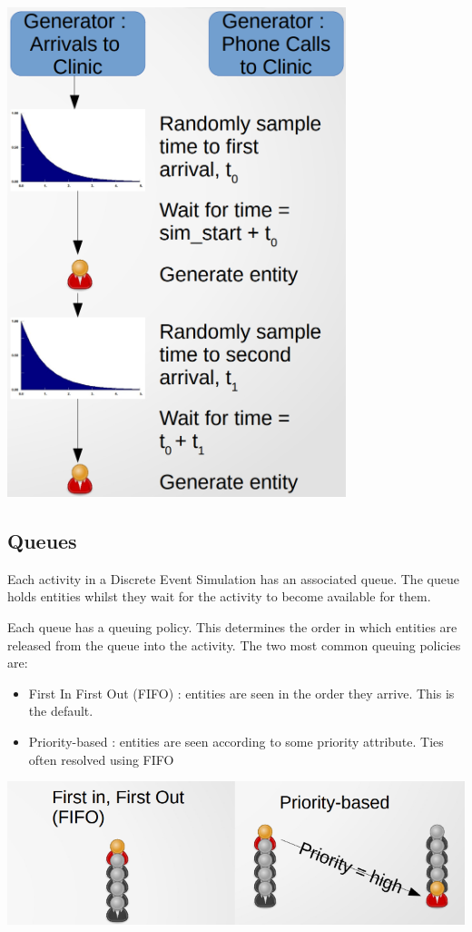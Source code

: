 \documentclass[
  letterpaper,
  DIV=11,
  numbers=noendperiod]{scrreprt}
\providecommand{\tightlist}{%
  \setlength{\itemsep}{0pt}\setlength{\parskip}{0pt}}\usepackage{longtable,booktabs,array}
\begin{document}
\includegraphics{images/generators_iat.png}

\subsection{Queues}\label{queues}

Each activity in a Discrete Event Simulation has an associated queue.
The queue holds entities whilst they wait for the activity to become
available for them.

Each queue has a queuing policy. This determines the order in which
entities are released from the queue into the activity. The two most
common queuing policies are:

\begin{itemize}
\tightlist
\item
  First In First Out (FIFO) : entities are seen in the order they
  arrive. This is the default.
\item
  Priority-based : entities are seen according to some priority
  attribute. Ties often resolved using FIFO
\end{itemize}

\includegraphics{images/queue_types.png}
\end{document}
